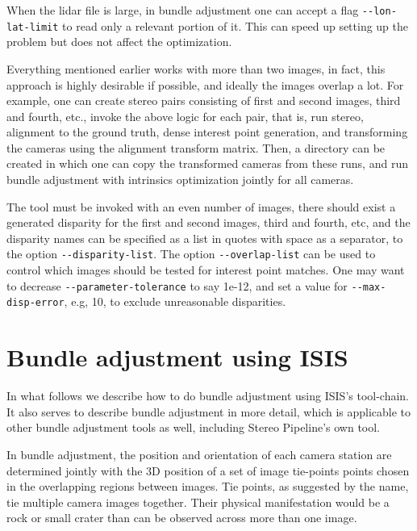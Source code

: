 When the lidar file is large, in bundle adjustment one can
accept a flag \texttt{-\/-lon-lat-limit} to read only a relevant portion of
it. This can speed up setting up the problem but does not affect the optimization.

Everything mentioned earlier works with more than two images, in fact,
this approach is highly desirable if possible, and ideally the images
overlap a lot. For example, one can create stereo pairs consisting of
first and second images, third and fourth, etc., invoke the above logic
for each pair, that is, run stereo, alignment to the ground truth, dense
interest point generation, and transforming the cameras using the
alignment transform matrix.  Then, a directory can be created in which
one can copy the transformed cameras from these runs, and run bundle
adjustment with intrinsics optimization jointly for all cameras.

The tool must be invoked with an even number of images, there should
exist a generated disparity for the first and second images, third and
fourth, etc, and the disparity names can be specified as a list in
quotes with space as a separator, to the option
\texttt{-\/-disparity-list}. The option \texttt{-\/-overlap-list} can be
used to control which images should be tested for interest point
matches. One may want to decrease \texttt{-\/-parameter-tolerance} to say 
1e-12, and set a value for \texttt{-\/-max-disp-error}, e.g, 10, to exclude
unreasonable disparities. 

\section{Bundle adjustment using ISIS}

In what follows we describe how to do bundle adjustment using
\ac{ISIS}'s tool-chain. It also serves to describe bundle adjustment in more
detail, which is applicable to other bundle adjustment tools as well,
including Stereo Pipeline's own tool.

In bundle adjustment, the position and orientation of each camera
station are determined jointly with the 3D position of a set of image
tie-points points chosen in the overlapping regions between
images. Tie points, as suggested by the name, tie multiple camera images
together. Their physical manifestation would be a rock or small crater
than can be observed across more than one image.


